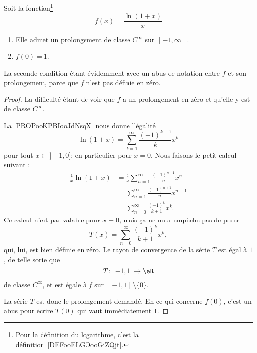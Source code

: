 \begin{lemma}
    Soit la fonction\footnote{Pour la définition du logarithme, c'est la définition~\ref{DEFooELGOooGiZQjt}.}
    \begin{equation}
        f(x)=\frac{ \ln(1+x) }{ x }
    \end{equation}
    \begin{enumerate}
        \item
        Elle admet un prolongement de classe \(  C^{\infty}\) sur \( \mathopen] -1 , \infty \mathclose[\).
        \item
            \( f(0)=1\).
    \end{enumerate}
    La seconde condition étant évidemment avec un abus de notation entre \( f\) et son prolongement, parce que \( f\) n'est pas définie en zéro.
\end{lemma}

\begin{proof}
    La difficulté étant de voir que \( f\) a un prolongement en zéro et qu'elle y est de classe \(  C^{\infty}\).

    La \ref{PROPooKPBIooJdNsqX} nous donne l'égalité
    \begin{equation}
        \ln(1+x)=\sum_{k=1}^{\infty}\frac{ (-1)^{k+1} }{ k }x^k
    \end{equation}
    pour tout \( x\in \mathopen] -1 , 0 \mathclose]\); en particulier pour \( x=0\). Nous faisons le petit calcul suivant :
    \begin{subequations}        \label{SUBEQooRLQOooEzNFDp}
        \begin{align}
            \frac{1}{ x }\ln(1+x)&= \frac{1}{ x }\sum_{n=1}^{\infty}\frac{ (-1)^{n+1} }{ n }x^n\\
            &=\sum_{n=1}^{\infty}\frac{ (-1)^{n+1} }{ n }x^{n-1}\\
            &=\sum_{n=0}^{\infty}\frac{ (-1)^k }{ k+1 }x^k.
        \end{align}
    \end{subequations}
    Ce calcul n'est pas valable pour \( x=0\), mais ça ne nous empèche pas de poser
    \begin{equation}
        T(x)=\sum_{n=0}^{\infty}\frac{ (-1)^k }{ k+1 }x^k,
    \end{equation}
    qui, lui, est bien définie en zéro. Le rayon de convergence de la série \( T\) est égal à \( 1\), de telle sorte que
    \begin{equation}
        T\colon \mathopen] -1 , 1 \mathclose[\to \eR \\
    \end{equation}
    de classe \(  C^{\infty}\), et est égale à \( f\) sur \( \mathopen] -1 , 1 \mathclose[\setminus\{ 0 \}\).

    La série \( T\) est donc le prolongement demandé. En ce qui concerne \( f(0)\), c'est un abus pour écrire \( T(0)\) qui vaut immédiatement \( 1\).
\end{proof}

